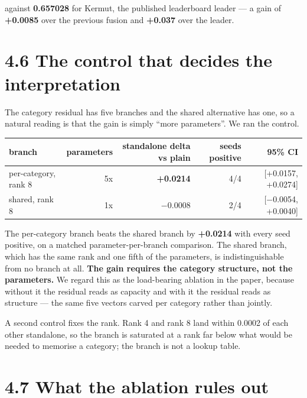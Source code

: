 \documentclass[sigconf,review,nonacm]{acmart}
\begin{document}
against \textbf{0.657028} for Kermut, the published leaderboard leader --- a gain of \textbf{+0.0085} over the
previous fusion and \textbf{+0.037} over the leader.

\hypertarget{the-control-that-decides-the-interpretation}{%
\section{4.6 The control that decides the interpretation}\label{the-control-that-decides-the-interpretation}}

The category residual has five branches and the shared alternative has one, so a natural reading is that
the gain is simply ``more parameters''. We ran the control.

\begin{table}[t]
\centering
\small
\begin{tabular}{lrrrr}
\hline
branch & parameters & standalone delta vs plain & seeds positive & 95\% CI \\
\hline
per-category, rank 8 & 5x & \textbf{+0.0214} & 4/4 & [+0.0157, +0.0274] \\
shared, rank 8 & 1x & −0.0008 & 2/4 & [−0.0054, +0.0040] \\
\hline
\end{tabular}
\end{table}

The per-category branch beats the shared branch by \textbf{+0.0214} with every seed positive, on a matched
parameter-per-branch comparison. The shared branch, which has the same rank and one fifth of the
parameters, is indistinguishable from no branch at all. \textbf{The gain requires the category structure, not
the parameters.} We regard this as the load-bearing ablation in the paper, because without it the
residual reads as capacity and with it the residual reads as structure --- the same five vectors carved
per category rather than jointly.

A second control fixes the rank. Rank 4 and rank 8 land within 0.0002 of each other standalone, so the
branch is saturated at a rank far below what would be needed to memorise a category; the branch is not
a lookup table.

\hypertarget{what-the-ablation-rules-out}{%
\section{4.7 What the ablation rules out}\label{what-the-ablation-rules-out}}
\end{document}
